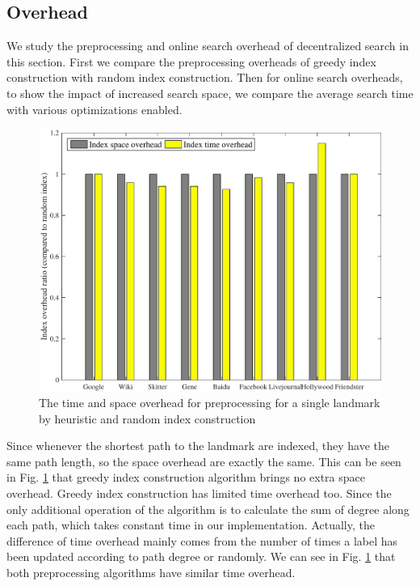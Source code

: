 \subsection{Overhead}
\label{eval_overhead}

We study the preprocessing and online search overhead of decentralized search in this section. First we compare the preprocessing overheads of greedy index construction with random index construction. Then for online search overheads, to show the impact of increased search space, we compare the average search time with various optimizations enabled. 

\begin{figure}[t]
    \centering
    \includegraphics[width=\linewidth]{../figures/overhead_index.pdf}
    \caption{The time and space overhead for preprocessing for a single landmark by heuristic and random index construction}
    \label{fig:overhead_index}
\end{figure}

Since whenever the shortest path to the landmark are indexed, they have the same path length, so the space overhead are exactly the same. This can be seen in Fig. \ref{fig:overhead_index} that greedy index construction algorithm brings no extra space overhead. Greedy index construction has limited time overhead too. Since the only additional operation of the algorithm is to calculate the sum of degree along each path, which takes constant time in our implementation. Actually, the difference of time overhead mainly comes from the number of times a label has been updated according to path degree or randomly. We can see in Fig. \ref{fig:overhead_index} that both preprocessing algorithms have similar time overhead.


